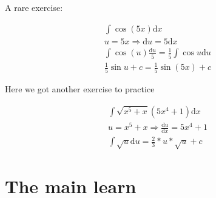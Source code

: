 \documentclass{article}
\begin{document}
\noindent A rare exercise: %

\begin{gather*}
\int \cos (5x) \mathrm{d}x \\
u = 5x \Rightarrow \mathrm{d}u = 5\mathrm{d}x \\
\int \cos (u) \frac{\mathrm{d}u}{5} = \frac{1}{5} \int \cos u \mathrm{d}u \\
\frac{1}{5}\sin u + c = \frac{1}{5}\sin (5x) + c
\end{gather*}

\par Here we got another exercise to practice

\begin{gather*}
\int \sqrt{x^5 + x}(5x^4 + 1) \mathrm{d}x \\
u = x^5 + x \Rightarrow \frac{\mathrm{d}u}{\mathrm{d}x} = 5x^4 + 1 \\
\int \sqrt{u} \mathrm{d}u = \frac{2}{3}*u*\sqrt{u} + c
\end{gather*}

\section*{The main learn}
\end{document}
